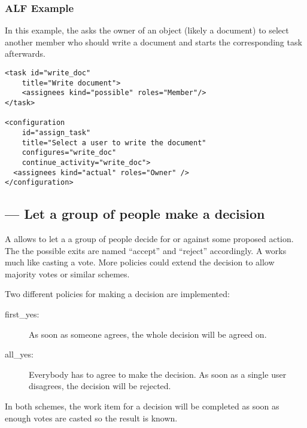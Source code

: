   \subsubsection{ALF Example}

  In this example, the  asks the owner of an object
  (likely a document) to select another member who should write a document and
  starts the corresponding task afterwards.

\begin{verbatim}
<task id="write_doc"
    title="Write document">
    <assignees kind="possible" roles="Member"/>
</task>

<configuration 
    id="assign_task" 
    title="Select a user to write the document"
    configures="write_doc"
    continue_activity="write_doc">
  <assignees kind="actual" roles="Owner" />
</configuration>
\end{verbatim}

 \subsection{ --- Let a group of people make a decision}
 
 
 A  allows to let a a group of people decide for or against
 some proposed action. The the possible exits are named ``accept'' and
 ``reject'' accordingly. A  works much like casting a vote.
 More policies could extend the decision to allow majority votes or similar
 schemes.
 
 Two different policies for making a decision are implemented:

 \begin{description}

     \item[first\_yes:] As soon as someone agrees, the whole decision will be
         agreed on.
         
     \item[all\_yes:] Everybody has to agree to make the decision. As soon as a
         single user disagrees, the decision will be rejected.
         
 \end{description}

 In both schemes, the work item for a decision will be completed as soon as
 enough votes are casted so the result is known.
 
